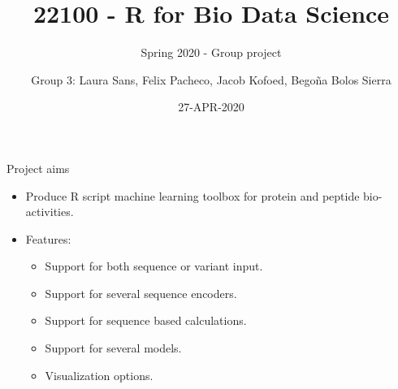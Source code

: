 \documentclass[ignorenonframetext,]{beamer}
\title{22100 - R for Bio Data Science}
\subtitle{Spring 2020 - Group project}
\author{Group 3: Laura Sans, Felix Pacheco, Jacob Kofoed, Begoña Bolos Sierra}
\date{27-APR-2020}
\providecommand{\tightlist}{%
  \setlength{\itemsep}{0pt}\setlength{\parskip}{0pt}}
\begin{document}
\frame{\titlepage}

\begin{frame}

\end{frame}

\begin{frame}{Project aims}
\protect\hypertarget{project-aims}{}

\begin{itemize}
\tightlist
\item
  Produce R script machine learning toolbox for protein and peptide
  bio-activities.
\item
  Features:

  \begin{itemize}
  \tightlist
  \item
    Support for both sequence or variant input.
  \item
    Support for several sequence encoders.
  \item
    Support for sequence based calculations.
  \item
    Support for several models.
  \item
    Visualization options.
  \end{itemize}
\end{itemize}

\end{frame}
\end{document}
